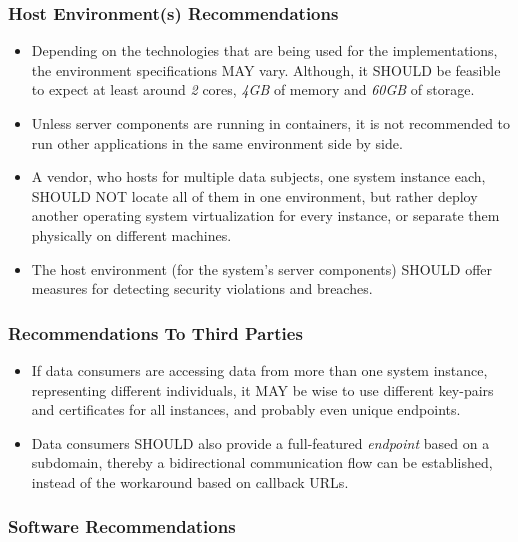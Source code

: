 \documentclass[12pt,english,a4paper,titlepage,cleardoublepage=empty,dottedtoc]{report}
\begin{document}
\subsubsection*{Host Environment(s)
Recommendations}\label{host-environments-recommendations}

\begin{itemize}
\item
  Depending on the technologies that are being used for the
  implementations, the environment specifications MAY vary. Although, it
  SHOULD be feasible to expect at least around \emph{2} cores,
  \emph{4GB} of memory and \emph{60GB} of storage.
\item
  Unless server components are running in containers, it is not
  recommended to run other applications in the same environment side by
  side.
\item
  A vendor, who hosts for multiple data subjects, one system instance
  each, SHOULD NOT locate all of them in one environment, but rather
  deploy another operating system virtualization for every instance, or
  separate them physically on different machines.
\item
  The host environment (for the system's server components) SHOULD offer
  measures for detecting security violations and breaches.
\end{itemize}

\subsubsection*{Recommendations To Third
Parties}\label{recommendations-to-third-parties}

\begin{itemize}
\item
  If data consumers are accessing data from more than one system
  instance, representing different individuals, it MAY be wise to use
  different key-pairs and certificates for all instances, and probably
  even unique endpoints.
\item
  Data consumers SHOULD also provide a full-featured \emph{endpoint}
  based on a subdomain, thereby a bidirectional communication flow can
  be established, instead of the workaround based on callback URLs.
\end{itemize}

\subsubsection*{Software
Recommendations}\label{software-recommendations}
\end{document}

